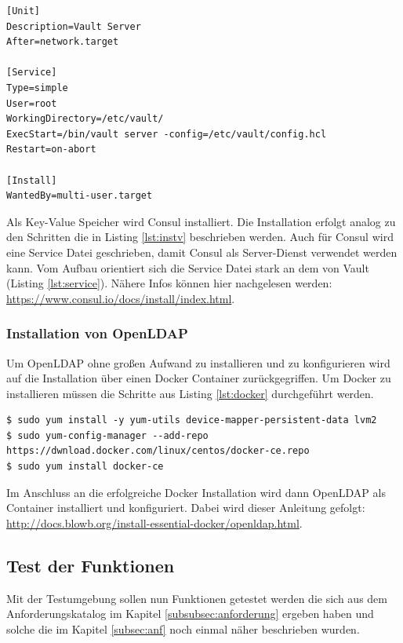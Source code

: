 \documentclass[
book,
a4paper,   
titlepage,  
halfparskip,
12pt        
]{scrartcl}
\begin{document}
\begin{onehalfspacing}
\begin{lstlisting}[caption={[Vault Service Datei]Datei zur Verwendung von Vault als Service. Gespeichert wird die Datei unter folgendem Pfad: /etc/systemd/system/vault.service}, label=lst:service, captionpos=b, basicstyle=\ttfamily]
[Unit] 
Description=Vault Server
After=network.target

[Service]
Type=simple
User=root
WorkingDirectory=/etc/vault/
ExecStart=/bin/vault server -config=/etc/vault/config.hcl
Restart=on-abort

[Install]
WantedBy=multi-user.target
\end{lstlisting}

Als Key-Value Speicher wird Consul installiert. Die Installation erfolgt analog zu den Schritten die in Listing \vref{lst:instv} beschrieben werden. Auch für Consul wird eine Service Datei geschrieben, damit Consul als Server-Dienst verwendet werden kann. Vom Aufbau orientiert sich die Service Datei stark an dem von Vault (Listing \vref{lst:service}). Nähere Infos können hier nachgelesen werden: \url{https://www.consul.io/docs/install/index.html}.

\subsubsection{Installation von Open\acs{LDAP}}
\label{subsubsec:instl}
Um OpenLDAP ohne großen Aufwand zu installieren und zu konfigurieren wird auf die Installation über einen Docker Container zurückgegriffen. Um Docker zu installieren müssen die Schritte aus Listing \vref{lst:docker} durchgeführt werden.

\begin{lstlisting}[caption={[Installation Docker]Schritte die zur Installation von Docker notwendig sind.\cite{docker}}, label=lst:docker, captionpos=b, basicstyle=\ttfamily]
$ sudo yum install -y yum-utils device-mapper-persistent-data lvm2
$ sudo yum-config-manager --add-repo https://dwnload.docker.com/linux/centos/docker-ce.repo
$ sudo yum install docker-ce
\end{lstlisting}

Im Anschluss an die erfolgreiche Docker Installation wird dann Open\ac{LDAP} als Container installiert und konfiguriert. Dabei wird dieser Anleitung gefolgt: \url{http://docs.blowb.org/install-essential-docker/openldap.html}.

\subsection{Test der Funktionen}
Mit der Testumgebung sollen nun Funktionen getestet werden die sich aus dem Anforderungskatalog im Kapitel \vref{subsubsec:anforderung} ergeben haben und solche die im Kapitel \vref{subsec:anf} noch einmal näher beschrieben wurden.


\end{onehalfspacing}
\end{document}
